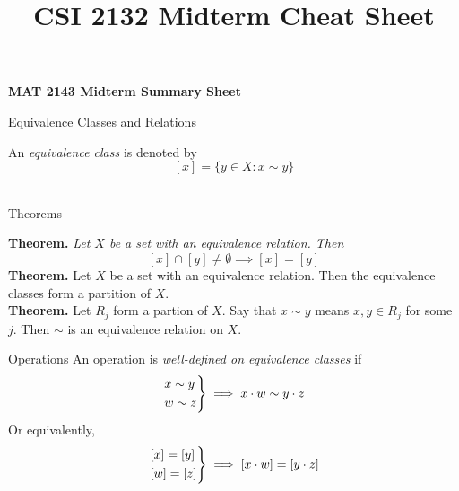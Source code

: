 \documentclass{article}
\title{CSI 2132 Midterm Cheat Sheet}
\begin{document}
\begin{center}
\large{\textbf{MAT 2143 Midterm Summary Sheet}}\\
\end{center}
\begin{multicols*}{3}
\begin{blackbox}{Equivalence Classes and Relations}
    An \emph{equivalence class} is denoted by\\[-2ex]
    \[[x] = \{y \in X: x \sim y\}\]\\[-4ex]
    \begin{redbox}{Theorems}
    \raggedright
    \textbf{Theorem.}\textit{ Let $X$ be a set with an equivalence relation. Then }\\[-1ex]
    $$[x] \cap [y] \neq \emptyset \implies [x] = [y]$$
    \textbf{Theorem.} Let $X$ be a set with an equivalence relation. Then the equivalence classes form a partition of $X$.\\[1ex]
    \textbf{Theorem.} Let $R_j$ form a partion of $X$. Say that $x \sim y$ means $x,y \in R_j$ for some $j$. Then $\sim$ is an equivalence relation on $X$.\\[1ex]
    \end{redbox}
    \begin{brownbox}{Operations}
    An operation is \emph{well-defined on equivalence classes} if 
    \[\begin{rcases}
    x \sim y\\
    w \sim z
    \end{rcases} \implies x \cdot w \sim y \cdot z\]
    Or equivalently, 
    \[\begin{rcases}
        [x] = [y]\\
        [w] = [z]
    \end{rcases} \implies [x \cdot w] = [y \cdot z]\]

\end{brownbox}
\end{blackbox}
\end{multicols*}
\end{document}
